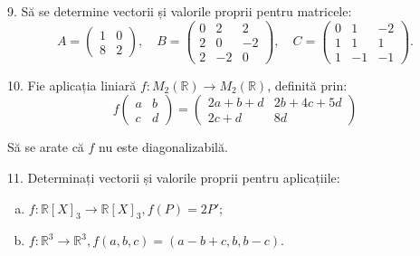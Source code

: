 \documentclass[11pt,a4paper]{article}
\newcommand\RR{\mathbb{R}}
\theoremstyle{dotless}
\theoremstyle{dotlessdr}
\begin{document}
\vspace{1cm}

9. Să se determine vectorii și valorile proprii pentru matricele:
\[
  A = \begin{pmatrix}
    1 & 0 \\
    8 & 2
  \end{pmatrix}, \quad
  B = \begin{pmatrix}
    0 & 2 & 2 \\
    2 & 0 & -2 \\
    2 & -2 & 0
  \end{pmatrix}, \quad
  C = \begin{pmatrix}
    0 & 1 & -2 \\
    1 & 1 & 1 \\
    1 & -1 & -1
  \end{pmatrix}.
\]

\vspace{1cm}

10. Fie aplicația liniară $f : M_2(\RR) \to M_2(\RR)$, definită prin:
\[
  f \begin{pmatrix}
    a & b \\
    c & d
  \end{pmatrix} = \begin{pmatrix}
    2a + b + d & 2b + 4c + 5d \\
    2c + d & 8d
  \end{pmatrix}
\]

Să se arate că $f$ nu este diagonalizabilă.

\vspace{1cm}

11. Determinați vectorii și valorile proprii pentru aplicațiile:
\begin{enumerate}[(a)]
\item $f : \RR[X]_3 \to \RR[X]_3, f(P) = 2P'$;
\item $f : \RR^3 \to \RR^3, f(a, b, c) = (a - b + c, b, b - c)$.
\end{enumerate}
\end{document}

